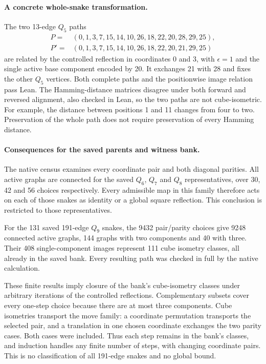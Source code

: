 \documentclass[11pt,a4paper]{article}
\theoremstyle{definition}
\theoremstyle{remark}
\begin{document}
\paragraph{A concrete whole-snake transformation.}
The two 13-edge $Q_5$ paths
\[
\begin{split}
P={}&(0,1,3,7,15,14,10,26,18,22,20,28,29,25),\\
P'={}&(0,1,3,7,15,14,10,26,18,22,20,21,29,25)
\end{split}
\]
are related by the controlled reflection in coordinates 0 and 3,
with $\epsilon=1$ and the single active base component encoded by 20.
It exchanges 21 with 28 and fixes the other $Q_5$ vertices.
Both complete paths and the positionwise image relation pass Lean.
The Hamming-distance matrices disagree under both forward and reversed
alignment, also checked in Lean, so the two paths are not cube-isometric.
For example, the distance between positions 1 and 11 changes from four
to two. Preservation of the whole path does not require preservation
of every Hamming distance.

\paragraph{Consequences for the saved parents and witness bank.}
The native census examines every coordinate pair and both diagonal
parities. All active graphs are connected for the saved $Q_6$, $Q_7$
and $Q_8$ representatives, over 30, 42 and 56 choices respectively.
Every admissible map in this family therefore acts on each of those
snakes as identity or a global square reflection. This conclusion is
restricted to those representatives.

For the 131 saved 191-edge $Q_9$ snakes, the 9432 pair/parity choices
give 9248 connected active graphs, 144 graphs with two components and
40 with three. Their 408 single-component images represent 111 cube
isometry classes, all already in the saved bank. Every resulting path
was checked in full by the native calculation.

These finite results imply closure of the bank's cube-isometry classes
under arbitrary iterations of the controlled reflections. Complementary
subsets cover every one-step choice because there are at most three
components. Cube isometries transport the move family: a coordinate
permutation transports the selected pair, and a translation in one
chosen coordinate exchanges the two parity cases. Both cases were
included. Thus each step remains in the bank's classes, and induction
handles any finite number of steps, with changing coordinate pairs.
This is no classification of all 191-edge snakes and no global bound.
\end{document}
